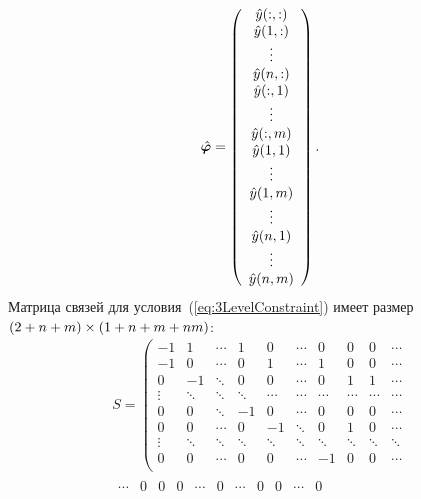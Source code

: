\begin{multicols}{2}
        \noindent
        $$
    \hphi = \left(%
        \begin{array}{c}
            \hy(:, :) \\
            \hy(1, :) \\
            \vdots \\
            \hy(n, :) \\
            \hy(:, 1) \\
            \vdots \\
            \hy(:, m) \\
            \hy(1, 1) \\
            \vdots \\
            \hy(1, m) \\
            \vdots \\
            \hy(n, 1) \\
            \vdots \\
            \hy(n, m) \\
        \end{array}%
        \right).
$$
Матрица связей для условия~(\ref{eq:3LevelConstraint}) имеет размер
$(2 \hm+ n \hm+ m) \times (1\hm + n \hm+ m \hm+ nm)$:
\begin{multline*}
    S =
\left(%
\begin{array}{c|ccc|ccc|ccc}
  -1 & 1 & \cdots & 1 & 0 & \cdots & 0 & 0 & 0 & \cdots\\
  -1 & 0 & \cdots & 0 & 1 & \cdots & 1 & 0 & 0 & \cdots\\
  \hline
  0 & -1 & \ddots & 0 & 0 & \cdots & 0 & 1 & 1 & \cdots \\
  \vdots & \ddots & \ddots & \ddots & \cdots & \cdots & \cdots & \cdots & \cdots & \cdots\\
  0 & 0 & \ddots & -1 & 0 & \cdots & 0 & 0 & 0 & \cdots\\
  \hline
  0 & 0 & \cdots & 0 & -1 & \ddots & 0 & 1 & 0 & \cdots\\
  \vdots & \ddots & \ddots &\ddots  &\ddots  & \ddots & \ddots &   \ddots &\ddots  & \ddots\\
  0 & 0 & \cdots & 0 & 0 & \cdots & -1 & 0 & 0 & \cdots\\
\end{array}\right.\\[6pt]
\left.
\begin{array}{cc|cccc|c|cccc}%
  \cdots & 0 & 0 & 0 & \cdots & 0 & \cdots & 0 & 0 & \cdots & 0 \\

\end{array}
\end{multline*}
\end{multicols}
